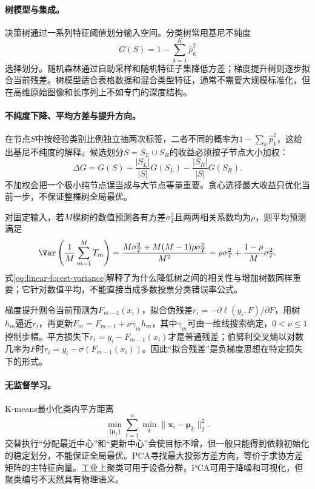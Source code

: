 \paragraph{树模型与集成。}
决策树通过一系列特征阈值划分输入空间。分类树常用基尼不纯度
\begin{equation}
 G(S)=1-\sum_{k=1}^{K}\hat p_k^2
\end{equation}
选择划分。随机森林通过自助采样和随机特征子集降低方差；梯度提升树则逐步拟合当前残差。树模型适合表格数据和混合类型特征，通常不需要大规模标准化，但在高维原始图像和长序列上不如专门的深度结构。

\paragraph{不纯度下降、平均方差与提升方向。}
在节点$S$中按经验类别比例独立抽两次标签，二者不同的概率为$1-\sum_k\hat p_k^2$，这给出基尼不纯度的解释。候选划分$S=S_L\cup S_R$的收益必须按子节点大小加权：
\begin{equation}
 \Delta G=G(S)-\frac{|S_L|}{|S|}G(S_L)-\frac{|S_R|}{|S|}G(S_R).
\end{equation}
不加权会把一个极小纯节点误当成与大节点等量重要。贪心选择最大收益只优化当前一步，不保证整棵树全局最优。

对固定输入，若$M$棵树的数值预测各有方差$\sigma_T^2$且两两相关系数均为$\rho$，则平均预测满足
\begin{equation}
 \Var\left(\frac1M\sum_{m=1}^MT_m\right)
 =\frac{M\sigma_T^2+M(M-1)\rho\sigma_T^2}{M^2}
 =\rho\sigma_T^2+\frac{1-\rho}{M}\sigma_T^2.\label{eq:linear-forest-variance}
\end{equation}
式\eqref{eq:linear-forest-variance}解释了为什么降低树之间的相关性与增加树数同样重要；它针对数值平均，不能直接当成多数投票分类错误率公式。

梯度提升则令当前预测为$F_{m-1}(x_i)$，拟合伪残差$r_i=-\partial\ell(y_i,F)/\partial F$，用树$h_m$逼近$r_i$，再更新$F_m=F_{m-1}+\nu\gamma_mh_m$，其中$\gamma_m$可由一维线搜索确定，$0<\nu\leq1$控制步幅。平方损失下$r_i=y_i-F_{m-1}(x_i)$才是普通残差；伯努利交叉熵以对数几率为$F$时$r_i=y_i-\sigma(F_{m-1}(x_i))$。因此“拟合残差”是负梯度思想在特定损失下的形式。

\paragraph{无监督学习。}
K-means最小化类内平方距离
\begin{equation}
 \min_{\{\bm{\mu}_k\}}\sum_{i=1}^{n}\min_k\|\bm{x}_i-\bm{\mu}_k\|_2^2.
\end{equation}
交替执行“分配最近中心”和“更新中心”会使目标不增，但一般只能得到依赖初始化的稳定划分，不能保证全局最优。PCA寻找最大投影方差方向，等价于求协方差矩阵的主特征向量。工业上聚类可用于设备分群，PCA可用于降噪和可视化，但聚类编号不天然具有物理语义。

